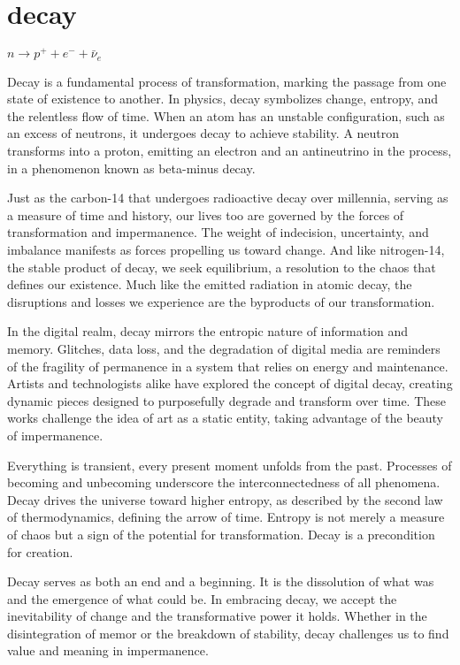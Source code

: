 \chapter*{decay}
\begin{center}
\vspace{2cm}
\begin{flushright}
\large
\textit{ $n \rightarrow p^+ + e^- + \bar{\nu}_e$ }
\end{flushright}
\vspace{2cm}
\end{center}
\normalsize

Decay is a fundamental process of transformation, marking the passage from one state of existence to another. In physics, decay symbolizes change, entropy, and the relentless flow of time. When an atom has an unstable configuration, such as an excess of neutrons, it undergoes decay to achieve stability. A neutron transforms into a proton, emitting an electron and an antineutrino in the process, in a phenomenon known as beta-minus decay. 

Just as the carbon-14 that undergoes radioactive decay over millennia, serving as a measure of time and history, our lives too are governed by the forces of transformation and impermanence. The weight of indecision, uncertainty, and imbalance manifests as forces propelling us toward change. And like nitrogen-14, the stable product of decay, we seek equilibrium, a resolution to the chaos that defines our existence. Much like the emitted radiation in atomic decay, the disruptions and losses we experience are the byproducts of our transformation.

In the digital realm, decay mirrors the entropic nature of information and memory. Glitches, data loss, and the degradation of digital media are reminders of the fragility of permanence in a system that relies on energy and maintenance. Artists and technologists alike have explored the concept of digital decay, creating dynamic pieces designed to purposefully degrade and transform over time. These works challenge the idea of art as a static entity, taking advantage of the beauty of impermanence.

Everything is transient, every present moment unfolds from the past. Processes of becoming and unbecoming underscore the interconnectedness of all phenomena. Decay drives the universe toward higher entropy, as described by the second law of thermodynamics, defining the arrow of time. Entropy is not merely a measure of chaos but a sign of the potential for transformation. Decay is a precondition for creation.

Decay serves as both an end and a beginning. It is the dissolution of what was and the emergence of what could be. In embracing decay, we accept the inevitability of change and the transformative power it holds. Whether in the disintegration of memor or the breakdown of stability, decay challenges us to find value and meaning in impermanence.
